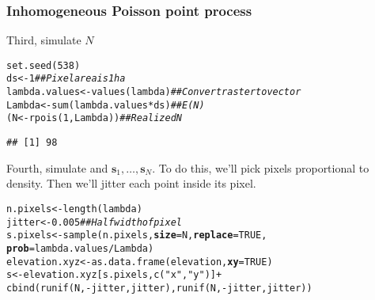 \documentclass[color=usenames,dvipsnames]{beamer}\usepackage[]{graphicx}\usepackage[]{color}
\makeatletter
\newcommand{\hlnum}[1]{\textcolor[rgb]{0.69,0.494,0}{#1}}%
\newcommand{\hlstr}[1]{\textcolor[rgb]{0.749,0.012,0.012}{#1}}%
\newcommand{\hlcom}[1]{\textcolor[rgb]{0.514,0.506,0.514}{\textit{#1}}}%
\newcommand{\hlopt}[1]{\textcolor[rgb]{0,0,0}{#1}}%
\newcommand{\hlstd}[1]{\textcolor[rgb]{0,0,0}{#1}}%
\newcommand{\hlkwb}[1]{\textcolor[rgb]{0,0.341,0.682}{#1}}%
\newcommand{\hlkwc}[1]{\textcolor[rgb]{0,0,0}{\textbf{#1}}}%
\newcommand{\hlkwd}[1]{\textcolor[rgb]{0.004,0.004,0.506}{#1}}%
\newenvironment{kframe}{%
 \def\at@end@of@kframe{}%
 \ifinner\ifhmode%
  \def\at@end@of@kframe{\end{minipage}}%
  \begin{minipage}{\columnwidth}%
 \fi\fi%
 \def\FrameCommand##1{\hskip\@totalleftmargin \hskip-\fboxsep
 \colorbox{shadecolor}{##1}\hskip-\fboxsep
     \hskip-\linewidth \hskip-\@totalleftmargin \hskip\columnwidth}%
 \MakeFramed {\advance\hsize-\width
   \@totalleftmargin\z@ \linewidth\hsize
   \@setminipage}}%
 {\par\unskip\endMakeFramed%
 \at@end@of@kframe}
\newenvironment{knitrout}{}{} %
\newcommand{\bs}{{\bm s}}
\makeatother
\begin{document}
\begin{frame}[fragile]
  \frametitle{Inhomogeneous Poisson point process}
  \small
  Third, simulate $N$
  \vspace{-6pt}
\begin{knitrout}\footnotesize
{}\color{fgcolor}\begin{kframe}
\begin{alltt}
\hlkwd{set.seed}\hlstd{(}\hlnum{538}\hlstd{)}
\hlstd{ds} \hlkwb{<-} \hlnum{1}                            \hlcom{## Pixel area is 1 ha}
\hlstd{lambda.values} \hlkwb{<-} \hlkwd{values}\hlstd{(lambda)}    \hlcom{## Convert raster to vector}
\hlstd{Lambda} \hlkwb{<-} \hlkwd{sum}\hlstd{(lambda.values}\hlopt{*}\hlstd{ds)}    \hlcom{## E(N)}
\hlstd{(N} \hlkwb{<-} \hlkwd{rpois}\hlstd{(}\hlnum{1}\hlstd{, Lambda))}            \hlcom{## Realized N}
\end{alltt}
\begin{verbatim}
## [1] 98
\end{verbatim}
\end{kframe}
\end{knitrout}
\pause
\vfill
Fourth, simulate and $\bs_1, \dots, \bs_N$. To do this, we'll pick
pixels proportional to density. Then we'll jitter each point
inside its pixel. 
  \vspace{-6pt}
\begin{knitrout}\footnotesize
{}\color{fgcolor}\begin{kframe}
\begin{alltt}
\hlstd{n.pixels} \hlkwb{<-} \hlkwd{length}\hlstd{(lambda)}
\hlstd{jitter} \hlkwb{<-} \hlnum{0.005}                    \hlcom{## Half width of pixel }
\hlstd{s.pixels} \hlkwb{<-} \hlkwd{sample}\hlstd{(n.pixels,} \hlkwc{size}\hlstd{=N,} \hlkwc{replace}\hlstd{=}\hlnum{TRUE}\hlstd{,}
                   \hlkwc{prob}\hlstd{=lambda.values}\hlopt{/}\hlstd{Lambda)}
\hlstd{elevation.xyz} \hlkwb{<-} \hlkwd{as.data.frame}\hlstd{(elevation,} \hlkwc{xy}\hlstd{=}\hlnum{TRUE}\hlstd{)}
\hlstd{s} \hlkwb{<-} \hlstd{elevation.xyz[s.pixels,}\hlkwd{c}\hlstd{(}\hlstr{"x"}\hlstd{,}\hlstr{"y"}\hlstd{)]} \hlopt{+}
    \hlkwd{cbind}\hlstd{(}\hlkwd{runif}\hlstd{(N,} \hlopt{-}\hlstd{jitter, jitter),}\hlkwd{runif}\hlstd{(N,} \hlopt{-}\hlstd{jitter, jitter))}
\end{alltt}
\end{kframe}
\end{knitrout}
\end{frame}
\end{document}
